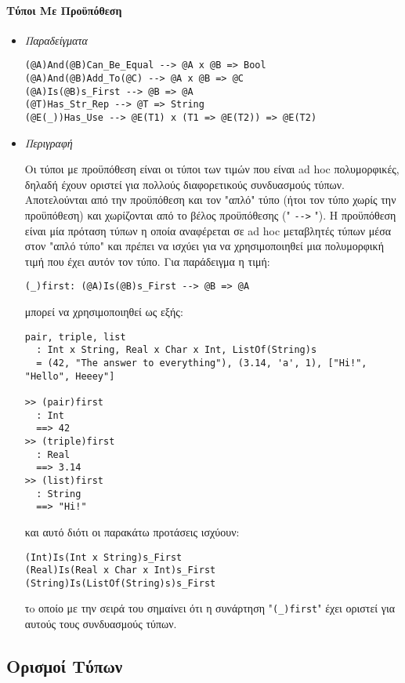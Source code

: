 \documentclass[diploma]{softlab-thesis}
\begin{document}
\newpage

\paragraph{Τύποι Με Προϋπόθεση}

\begin{itemize}
\item \textit{Παραδείγματα}
\begin{verbatim}
(@A)And(@B)Can_Be_Equal --> @A x @B => Bool
(@A)And(@B)Add_To(@C) --> @A x @B => @C
(@A)Is(@B)s_First --> @B => @A
(@T)Has_Str_Rep --> @T => String
(@E(_))Has_Use --> @E(T1) x (T1 => @E(T2)) => @E(T2)
\end{verbatim}

\item \textit{Περιγραφή}

Οι τύποι με προϋπόθεση είναι οι τύποι των τιμών που είναι ad hoc πολυμορφικές,
δηλαδή έχουν οριστεί για πολλούς διαφορετικούς συνδυασμούς τύπων. Αποτελούνται
από την προϋπόθεση και τον "απλό" τύπο (ήτοι τον τύπο χωρίς την προϋπόθεση)
και χωρίζονται από το βέλος προϋπόθεσης (" \verb|-->| "). Η προϋπόθεση είναι
μία πρόταση τύπων η οποία αναφέρεται σε ad hoc μεταβλητές τύπων μέσα
στον "απλό τύπο" και πρέπει να ισχύει για να χρησιμοποιηθεί μια πολυμορφική
τιμή που έχει αυτόν τον τύπο. Για παράδειγμα η τιμή:
\begin{verbatim}
(_)first: (@A)Is(@B)s_First --> @B => @A
\end{verbatim}
μπορεί να χρησιμοποιηθεί ως εξής:
\begin{verbatim}
pair, triple, list
  : Int x String, Real x Char x Int, ListOf(String)s
  = (42, "The answer to everything"), (3.14, 'a', 1), ["Hi!", "Hello", Heeey"]

>> (pair)first
  : Int
  ==> 42
>> (triple)first
  : Real
  ==> 3.14
>> (list)first
  : String
  ==> "Hi!"
\end{verbatim}
και αυτό διότι οι παρακάτω προτάσεις ισχύουν:
\begin{verbatim}
(Int)Is(Int x String)s_First
(Real)Is(Real x Char x Int)s_First
(String)Is(ListOf(String)s)s_First
\end{verbatim}
τo οποίο με την σειρά του σημαίνει ότι η συνάρτηση "\verb|(_)first|" έχει
οριστεί για αυτούς τους συνδυασμούς τύπων.

\end{itemize}

\newpage

\subsection{Ορισμοί Τύπων}
\end{document}
